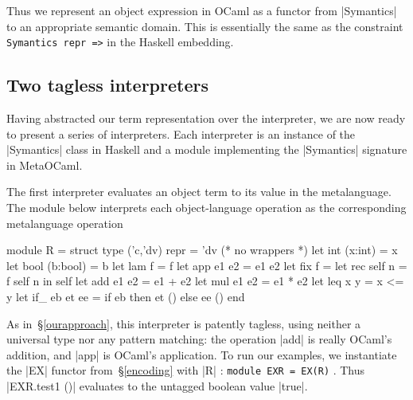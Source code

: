 Thus we represent an object expression in
OCaml as a functor from |Symantics| to an appropriate semantic domain. This
is essentially the same as the constraint \texttt{Symantics repr =>} in the
Haskell embedding.

\subsection{Two tagless interpreters}
\label{S:interpreter-RL}

Having abstracted our term representation over the interpreter, we are
now ready to present a series of interpreters.  Each interpreter is an
instance of the |Symantics| class in Haskell and a module implementing
the |Symantics| signature in MetaOCaml.

The first interpreter evaluates an object term to its value in the
metalanguage.  The module below interprets each object\hyp language
operation as the corresponding metalanguage operation
\vspace*{-0.8em}\begin{code3}
module R = struct type ('c,'dv) repr = 'dv (* no wrappers *)
  let int  (x:int)  = x         let bool (b:bool) = b
  let lam  f        = f         let app  e1 e2    = e1 e2
  let fix  f        = let rec self n = f self n in self
  let add  e1 e2    = e1 + e2   let mul  e1 e2    = e1 * e2
  let leq  x y      = x <= y
  let if_  eb et ee = if eb then et () else ee () end
\end{code3}
\vspace*{-0.8em}
%
As in~\S\ref{ourapproach},
this interpreter is patently tagless, using neither a universal type nor
any pattern matching: the operation |add| is really
OCaml's addition, and |app| is OCaml's application. To run our
examples, we instantiate the |EX| functor from~\S\ref{encoding} with |R|%
: \texttt{module EXR = EX(R)}%
.
Thus |EXR.test1 ()| evaluates to the untagged boolean value |true|.
\begin{comment}
In Haskell, we define
\begin{code}
newtype R a = R {unR::a}
instance Symantics R where ...
\end{code}
Although |R| looks like a tag, it is only
a |newtype|.  The types |a| and |R a| are represented differently
only at compile time, not at run time.  Pattern matching against~|R|
cannot ever fail and is assuredly compiled away.
In OCaml, too, it is obvious to the compiler that
\end{comment}
